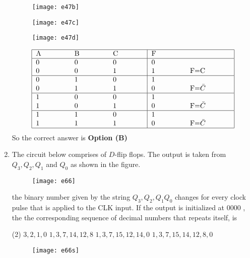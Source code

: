 \begin{enumerate}
\begin{tasks}
\begin{figure}[H]
	\centering
	\texttt{[image: e47b]}
\end{figure}
\task[\textbf{C.}] \begin{figure}[H]
	\centering
	\texttt{[image: e47c]}
\end{figure}
\task[\textbf{D.}] \begin{figure}[H]
	\centering
	\texttt{[image: e47d]}
\end{figure}
\end{tasks}
\begin{answer}
\begin{align*}
\renewcommand*{\arraystretch}{1}
\begin{tabular}{|p{1.5cm} p{1.5cm} p{1.5cm}|p{1.5cm}p{2cm}|}
\hline
A&B&C&F&$\left. \right. $\\
\hline
0&0&0&0&\\
0&0&1&1&F=C\\\hline
0&1&0&1&\\
0&1&1&0&F=$\bar{C}$\\\hline
1&0&0&1&\\
1&0&1&0&F=$\bar{C}$\\\hline
1&1&0&1&\\
1&1&1&0&F=$\bar{C}$\\\hline
\end{tabular}
\end{align*}
So the correct answer is \textbf{Option (B)}
\end{answer}
	\item The circuit below comprises of $D$-flip flops. The output is taken from $Q_{3}, Q_{2}, Q_{1}$ and $Q_{0}$ as shown in the figure.\\
	\begin{figure}[H]
		\centering
		\texttt{[image: e66]}
	\end{figure}
	the binary number given by the string $Q_{3}, Q_{2}, Q_{1} Q_{0}$ changes for every clock pulse that is applied to the CLK input. If the output is initialized at 0000 , the the corresponding sequence of decimal numbers that repeats itself, is
\begin{tasks}(2)
\task[\textbf{A.}] $3,2,1,0$
\task[\textbf{B.}] $1,3,7,14,12,8$
\task[\textbf{C.}] $1,3,7,15,12,14,0$
\task[\textbf{D.}] $1,3,7,15,14,12,8,0$
\end{tasks}
\begin{answer}
\begin{figure}[H]
	\centering
	\texttt{[image: e66s]}

\end{figure}
\end{answer}
\end{enumerate}
